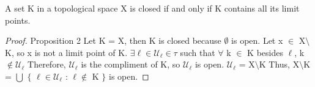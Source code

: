 \documentclass{article}
\begin{document}
	\begin{proposition}
		A set K in a topological space X is closed if and only if K contains all its limit points.
	\end{proposition}
	\begin{proof}
	Proposition 2
	\newline
	Let K = X, then K is closed because $\emptyset$ is open.
	\newline
	Let x $\in$ X$\setminus$K, so x is not a limit point of K.
	\newline
	$\exists \ell \in \mathcal{U}_\ell \in \tau$ such that $\forall$ k $\in$ K besides $\ell$, k $\not\in \mathcal{U}_\ell$
	\newline
	Therefore, $\mathcal{U}_\ell$ is the compliment of K, so $\mathcal{U}_\ell$ is open.
	\newline
	$\mathcal{U}_\ell$ = X$\setminus$K
	\newline
	Thus, X$\setminus$K = $\bigcup$ $\lbrace$ $\ell \in \mathcal{U}_\ell$ : $\ell \not\in$ K $\rbrace$ is open. 
	\end{proof}
\end{document}
